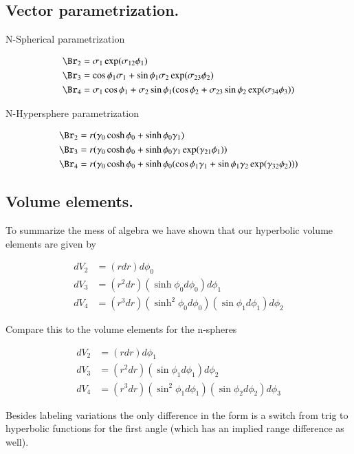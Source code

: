 \subsection{Vector parametrization. }

N-Spherical parametrization

\begin{align}
\Br_2 &= \sigma_1 \exp( \sigma_{12} \phi_1 ) \\
\Br_3 &= \cos\phi_1 \sigma_1 + \sin\phi_1 \sigma_2 \exp( \sigma_{23} \phi_2 ) \\
\Br_4 &= \sigma_1 \cos\phi_1 + \sigma_2 \sin\phi_1 (\cos\phi_2 + \sigma_{23} \sin\phi_2 \exp(\sigma_{34}\phi_3) ) 
\end{align}

N-Hypersphere parametrization

\begin{align}
\Br_2 &= r (\gamma_0 \cosh \phi_0 + \sinh\phi_0 \gamma_1) \\
\Br_3 &= r (\gamma_0 \cosh \phi_0 + \sinh\phi_0 \gamma_1 \exp( \gamma_{21} \phi_1 ) ) \\
\Br_4 &= r (\gamma_0 \cosh \phi_0 + \sinh\phi_0 ( \cos\phi_1 \gamma_1 + \sin\phi_1 \gamma_2 \exp( \gamma_{32} \phi_2 )) )
\end{align}

\subsection{Volume elements. }

To summarize the mess of algebra we have shown that our hyperbolic volume elements are given by

\begin{align}
dV_2 &= \left(r dr\right) d\phi_0 \\
dV_3 &= \left(r^2 dr\right) \left(\sinh\phi_0 d\phi_0\right) d\phi_1 \\
dV_4 &= \left(r^3 dr\right) \left(\sinh^2 \phi_0 d\phi_0\right) \left(\sin\phi_1 d\phi_1\right) d\phi_2
\end{align}

Compare this to the volume elements for the n-spheres

\begin{align}
dV_2 &= \left(r dr\right) d\phi_1 \\
dV_3 &= \left(r^2 dr\right) \left(\sin\phi_1 d\phi_1\right) d\phi_2 \\
dV_4 &= \left(r^3 dr\right) \left(\sin^2\phi_1 d\phi_1\right) \left(\sin\phi_2 d\phi_2\right) d\phi_3 
\end{align}

Besides labeling variations the only difference in the form is a switch from trig to hyperbolic functions for the first angle (which has an implied
range difference as well).
